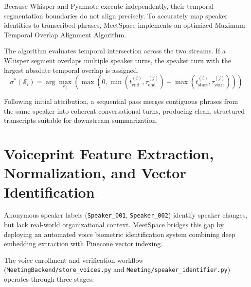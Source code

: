 \documentclass[12pt,oneside,letterpaper]{report}
\numberwithin{equation}{chapter} %
\begin{document}
Because Whisper and Pyannote execute independently, their temporal segmentation boundaries do not align precisely. To accurately map speaker identities to transcribed phrases, MeetSpace implements an optimized Maximum Temporal Overlap Alignment Algorithm.

The algorithm evaluates temporal intersection across the two streams. If a Whisper segment overlaps multiple speaker turns, the speaker turn with the largest absolute temporal overlap is assigned:
\begin{equation}
\sigma^*(\mathcal{S}_i) = \arg\max_{\sigma_j} \left( \max\left(0, \min(t_{\text{end}}^{(i)}, \tau_{\text{end}}^{(j)}) - \max(t_{\text{start}}^{(i)}, \tau_{\text{start}}^{(j)})\right) \right)
\label{eq:overlap_assignment}
\end{equation}

Following initial attribution, a sequential pass merges contiguous phrases from the same speaker into coherent conversational turns, producing clean, structured transcripts suitable for downstream summarization.

\section{Voiceprint Feature Extraction, Normalization, and Vector Identification}
Anonymous speaker labels (\texttt{Speaker\_001}, \texttt{Speaker\_002}) identify speaker changes, but lack real-world organizational context. MeetSpace bridges this gap by deploying an automated voice biometric identification system combining deep embedding extraction with Pinecone vector indexing.

The voice enrollment and verification workflow (\texttt{MeetingBackend/store\_voices.py} and \texttt{Meeting/speaker\_identifier.py}) operates through three stages:
\end{document}
